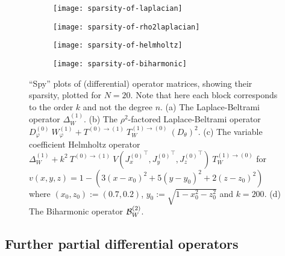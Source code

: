 \begin{figure}[tp]
	\centering %
	\begin{subfigure}{0.5\textwidth}
		\centerline{\texttt{[image: sparsity-of-laplacian]}}
		\centering
		\caption{}
	\end{subfigure}\hfil %
	\begin{subfigure}{0.5\textwidth}
		\centerline{\texttt{[image: sparsity-of-rho2laplacian]}}
		\centering
		\caption{}
	\end{subfigure}\hfil %

	\medskip
	\begin{subfigure}{0.5\textwidth}
		\centerline{\texttt{[image: sparsity-of-helmholtz]}}
		\centering
		\caption{}
	\end{subfigure}\hfil %
	\begin{subfigure}{0.5\textwidth}
		\centerline{\texttt{[image: sparsity-of-biharmonic]}}
		\centering
		\caption{} 
	\end{subfigure}\hfil %
	\caption{\enquote{Spy} plots of (differential) operator matrices, showing their sparsity, plotted for $N = 20$. Note that here each block corresponds to the order $k$ and not the degree $n$. (a) The Laplace-Beltrami operator $\Delta^{(1)}_W$. (b) The $\rho^2$-factored Laplace-Beltrami operator $D_\varphi^{(0)} \: W_\varphi^{(1)} + T^{(0)\to(1)} \: T_W^{(1)\to(0)} \: (D_\theta)^2$. (c) The variable coefficient Helmholtz operator $\Delta^{(1)}_W + k^2 \: T^{(0)\to(1)} \: V({J_x^{(0)}}^\top, {J_y^{(0)}}^\top, {J_z^{(0)}}^\top) \: T_W^{(1)\to(0)}$ for $v(x,y,z) = 1 - (3(x-x_0)^2 + 5(y-y_0)^2 + 2(z-z_0)^2)$ where $(x_0, z_0) := (0.7, 0.2)$, $y_0 := \sqrt{1 - x_0^2 - z_0^2}$ and $k = 200$. (d) The Biharmonic operator $\mathcal{B}_W^{(2)}$.}
	\label{fig:sc:sparsity}
\end{figure}



\subsection{Further partial differential operators}\label{section:sc:furtherdiffoperators}

